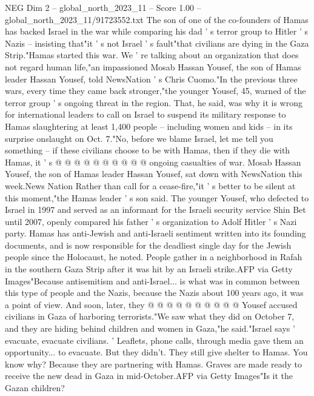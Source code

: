 \begin{textsample}{NEG Dim 2 – global\_north\_2023\_11 – Score 1.00 – global\_north\_2023\_11/91723552.txt}  \label{ex:f2_neg_141}
The son of one of the co-founders of Hamas has backed Israel in the war while comparing his dad ' s terror group to Hitler ' s Nazis -- insisting that"it ' s not Israel ' s fault"that civilians are dying in the Gaza Strip."Hamas started this war.
We ' re talking about an organization that does not regard human life,"an impassioned Mosab Hassan Yousef, the son of Hamas leader Hassan Yousef, told NewsNation ' s Chris Cuomo."In the previous three wars, every time they came back stronger,"the younger Yousef, 45, warned of the terror group ' s ongoing threat in the region.
That, he said, was why it is wrong for international leaders to call on Israel to suspend its military response to Hamas slaughtering at least 1,400 people -- including women and kids -- in its surprise onslaught on Oct. 7."No, before we blame Israel, let me tell you something -- if these civilians choose to be with Hamas, then if they die with Hamas, it ' s @ @ @ @ @ @ @ @ @ @ ongoing casualties of war.
Mosab Hassan Yousef, the son of Hamas leader Hassan Yousef, sat down with NewsNation this week.News Nation Rather than call for a cease-fire,"it ' s better to be silent at this moment,"the Hamas leader ' s son said.
The younger Yousef, who defected to Israel in 1997 and served as an informant for the Israeli security service Shin Bet until 2007, openly compared his father ' s organization to Adolf Hitler ' s Nazi party.
Hamas has anti-Jewish and anti-Israeli sentiment written into its founding documents, and is now responsible for the deadliest single day for the Jewish people since the Holocaust, he noted.
People gather in a neighborhood in Rafah in the southern Gaza Strip after it was hit by an Israeli strike.AFP via Getty Images"Because antisemitism and anti-Israel... is what was in common between this type of people and the Nazis, because the Nazis about 100 years ago, it was a point of view.
And soon, later, they @ @ @ @ @ @ @ @ @ @ Yousef accused civilians in Gaza of harboring terrorists."We saw what they did on October 7, and they are hiding behind children and women in Gaza,"he said."Israel says ' evacuate, evacuate civilians. ' Leaflets, phone calls, through media gave them an opportunity... to evacuate.
But they didn't.
They still give shelter to Hamas.
You know why?
Because they are partnering with Hamas.
Graves are made ready to receive the new dead in Gaza in mid-October.AFP via Getty Images"Is it the Gazan children?

\end{textsample}
